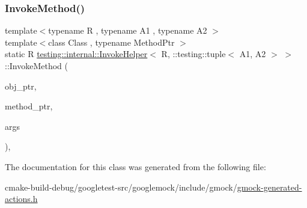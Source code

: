 \mbox{\label{classtesting_1_1internal_1_1InvokeHelper_3_01R_00_01_1_1testing_1_1tuple_3_01A1_00_01A2_01_4_01_4_a227b8f07bfda13f6cb390655fc84f1ee}} 
\subsubsection{\texorpdfstring{InvokeMethod()}{InvokeMethod()}}
{\footnotesize\ttfamily template$<$typename R , typename A1 , typename A2 $>$ \\
template$<$class Class , typename Method\+Ptr $>$ \\
static R \mbox{\hyperlink{classtesting_1_1internal_1_1InvokeHelper}{testing\+::internal\+::\+Invoke\+Helper}}$<$ R, \+::testing\+::tuple$<$ A1, A2 $>$ $>$\+::Invoke\+Method (\begin{DoxyParamCaption}\item[{Class $\ast$}]{obj\+\_\+ptr,  }\item[{Method\+Ptr}]{method\+\_\+ptr,  }\item[{const \+::testing\+::tuple$<$ A1, A2 $>$ \&}]{args }\end{DoxyParamCaption})\hspace{0.3cm}{\ttfamily [inline]}, {\ttfamily [static]}}



The documentation for this class was generated from the following file\+:\begin{DoxyCompactItemize}
\item 
cmake-\/build-\/debug/googletest-\/src/googlemock/include/gmock/\mbox{\hyperlink{gmock-generated-actions_8h}{gmock-\/generated-\/actions.\+h}}\end{DoxyCompactItemize}
